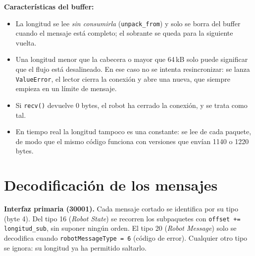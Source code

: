 \documentclass[10pt,a4paper]{article}
\newcommand{\code}[1]{\texttt{\small #1}}
\begin{document}
\vspace{-6pt}
\textbf{Características del buffer:}
\begin{itemize}[leftmargin=*, labelsep=3pt, itemsep=2pt]
  \item La longitud se lee \emph{sin consumirla} (\code{unpack\_from}) y solo se borra del buffer cuando el mensaje está completo; el sobrante se queda para la siguiente vuelta. 
  \item Una longitud menor que la cabecera o mayor que 64\,kB solo puede significar que el flujo está desalineado. En ese caso no se intenta resincronizar: se lanza \code{ValueError}, el lector cierra la conexión y abre una nueva, que siempre empieza en un límite de mensaje.
  \item Si \code{recv()} devuelve 0 bytes, el robot ha cerrado la conexión, y se trata como tal. 
  \item En tiempo real la longitud tampoco es una constante: se lee de cada paquete, de modo que el mismo código funciona con versiones que envían 1140 o 1220 bytes.
\end{itemize}

\section{Decodificación de los mensajes}

\textbf{Interfaz primaria (30001).} Cada mensaje cortado se identifica por su tipo (byte 4). Del tipo 16 (\emph{Robot State}) se recorren los subpaquetes con \code{offset += longitud\_sub}, sin suponer ningún orden. El tipo 20 (\emph{Robot Message}) solo se decodifica cuando \code{robotMessageType = 6} (código de error). Cualquier otro tipo se ignora: su longitud ya ha permitido saltarlo.
\end{document}
